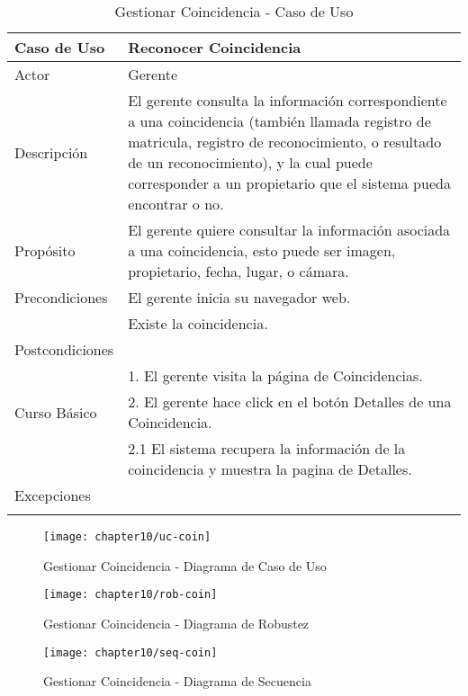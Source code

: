     \begin{longtable}{@{} p{3cm} p{10cm} @{}} \toprule
    \textbf{Caso de Uso}    & Reconocer Coincidencia \\ \midrule
    Actor                   & Gerente \\ \cmidrule{1-2}
    Descripción             & El gerente consulta la información correspondiente a una coincidencia (también llamada registro de matricula, registro de reconocimiento, o resultado de un reconocimiento), y la cual puede corresponder a un propietario que el sistema pueda encontrar o no. \\ \cmidrule{1-2}
    Propósito               & El gerente quiere consultar la información asociada a una coincidencia, esto puede ser imagen, propietario, fecha, lugar, o cámara. \\ \cmidrule{1-2}
    Precondiciones          & El gerente inicia su navegador web. \\ 
                            & Existe la coincidencia. \\ \cmidrule{1-2} 
    Postcondiciones         &  \\ \cmidrule{1-2} 
                            & 1. El gerente visita la página de Coincidencias. \\ 
    Curso Básico            & 2. El gerente hace click en el botón Detalles de una Coincidencia. \\
                            & 2.1 El sistema recupera la información de la coincidencia y muestra la pagina de Detalles. \\ \cmidrule{1-2}
    Excepciones             & \\ \bottomrule
   \caption{Gestionar Coincidencia - Caso de Uso} \label{tab:tabcu-coin}  \\
   \end{longtable}
    
    \begin{figure}[H]
        \centering
        \texttt{[image: chapter10/uc-coin]}
        \caption{Gestionar Coincidencia - Diagrama de Caso de Uso}
        \label{fig:uc-coin}
    \end{figure}
    
    \begin{landscape}
    \begin{figure}[H]
        \centering
        \texttt{[image: chapter10/rob-coin]}
        \caption{Gestionar Coincidencia - Diagrama de Robustez}
        \label{fig:rob-coin}
    \end{figure}
    
    \begin{figure}[H]
        \centering
        \texttt{[image: chapter10/seq-coin]}
        \caption{Gestionar Coincidencia - Diagrama de Secuencia }
        \label{fig:seq-coin}
    \end{figure}
    \end{landscape}
    
